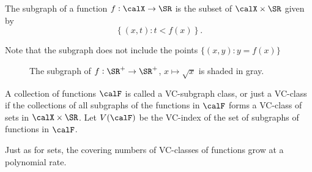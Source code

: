 \begin{definition}[Subgraph]
	\label{def:subgraph}
	The subgraph of a function \(f:\calX\to\SR\) is the subset of \(\calX\times\SR\) given by 
	\[
		\left\{(x,t): t< f(x)\right\}
	.\] 
\end{definition}
\begin{remark*}
	Note that the subgraph does not include the points \(\{(x,y): y=f(x)\} \)
\end{remark*}
\begin{figure}[htpb]
	\centering
	\caption{The subgraph of \(f: \SR^+ \to \SR^+\), \(x\mapsto \sqrt{x}\) is shaded in gray. }%
	\label{fig:subgraph}
\end{figure}
\begin{definition}
	\label{def:vc-function-class}
	A collection of functions \(\calF\) is called a VC-subgraph class, or just a VC-class if the collections of all subgraphs of the functions in \(\calF\) forms a VC-class of sets in \(\calX\times\SR\). Let \(V(\calF)\) be the VC-index of the set of subgraphs of functions in \(\calF\).	
\end{definition}

Just as for sets, the covering numbers of VC-classes of functions grow at a polynomial rate. 

